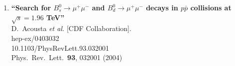 \documentclass{article}
\begin{document}
\begin{enumerate}
\item%
{\bf ``Search for $B_s^0 \to \mu^+ \mu^-$ and $B_d^0 \to \mu^+ \mu^-$ decays in $p\bar{p}$ collisions at $\sqrt{s} = 1.96$ TeV''}
  \\{}D.~Acousta {\it et al.}  [CDF Collaboration].
  \\{}hep-ex/0403032
    \\{}10.1103/PhysRevLett.93.032001
\\{}Phys.\ Rev.\ Lett.\  {\bf 93}, 032001 (2004) %



\end{enumerate}
\end{document}
